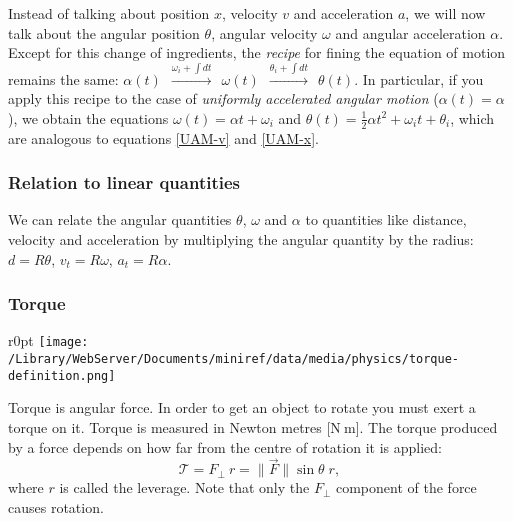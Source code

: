 \documentclass[letterpaper,9pt,journal]{IEEEtran}
\newcommand{\be}{\begin{equation}}
\newcommand{\ee}{\end{equation}}
\begin{document}
Instead of talking about position $x$, velocity $v$ and acceleration $a$,
we will now talk about the angular position $\theta$, angular velocity $\omega$
and angular acceleration $\alpha$.
Except for this change of ingredients, the \emph{recipe} for fining the 
equation of motion remains the same:
$\alpha(t) 
  \ \ \overset{\omega_i + \int\!dt}{\longrightarrow} 
  \ \ \omega(t) \ \  \overset{\theta_i+ \int\!dt }{\longrightarrow} 
  \ \ \theta(t)$.
In particular, if you apply this recipe to the case of \emph{uniformly accelerated angular motion} 
($\alpha(t) = \alpha$), we obtain the equations $\omega(t)= \alpha t + \omega_i$ and 
$\theta(t) = \frac{1}{2}\alpha t^2 + \omega_it + \theta_i$,
which are analogous to equations  \eqref{UAM-v} and  \eqref{UAM-x}.

\subsubsection{Relation to linear quantities}
%
We can relate the angular quantities $\theta$, $\omega$ and $\alpha$ to quantities 
like distance, velocity and acceleration by multiplying the angular quantity by the radius:
$d = R\theta$, $v_t = R\omega$, $a_t = R\alpha$.



\subsubsection{Torque}

\begin{wrapfigure}{r}{0pt}
\texttt{[image: /Library/WebServer/Documents/miniref/data/media/physics/torque-definition.png]}
\end{wrapfigure}
Torque is angular force. 
In order to get an object to rotate you must exert a torque on it.
Torque is measured in Newton metres [N$\:$m]. 
The torque produced by a force depends on how far from the centre of rotation it is applied:
\be
 \mathcal{T} = F_{\!\perp}\: r = \|\vec{F}\|\sin\theta\; r,
 \label{TORQUE}
\ee
where $r$ is called the leverage.  
Note that only the $F_{\perp}$ component of the force causes rotation. 
\end{document}
